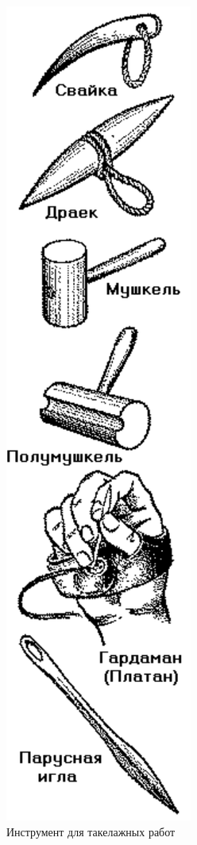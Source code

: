\documentclass[a4paper, 12pt, twoside, final]{scrbook}
\begin{document}
\begin{figure}
   \centering
   \includegraphics{58_Instrument_takelazh_rabot} %
   \caption{Инструмент для такелажных работ}
   \label{fig:58}
\end{figure}
\end{document}
